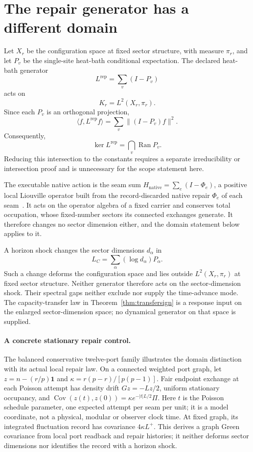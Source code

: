 \documentclass[11pt]{article}
\theoremstyle{remark}
\begin{document}
\section{The repair generator has a different domain}

Let \(X_r\) be the configuration space at fixed sector structure, with
measure \(\pi_r\), and let \(P_v\) be the single-site heat-bath conditional
expectation. The declared heat-bath generator
\[
L^{\mathrm{rep}}=\sum_v(I-P_v)
\]
acts on
\[
K_r=L^2(X_r,\pi_r).
\]
Since each \(P_v\) is an orthogonal projection,
\[
\langle f,L^{\mathrm{rep}}f\rangle
=\sum_v\|(I-P_v)f\|^2.
\]
Consequently,
\[
\ker L^{\mathrm{rep}}=\bigcap_v\operatorname{Ran}P_v.
\]
Reducing this intersection to the constants requires a separate
irreducibility or intersection proof and is unnecessary for the scope
statement here.

The executable native action is the seam sum
\(H_{\mathrm{native}}=\sum_e(I-\Phi_e)\), a positive local Liouville operator
built from the record-discarded native repair \(\Phi_e\) of each
seam~\cite{ophnativeaction}. It acts on the operator algebra of a fixed
carrier and conserves total occupation, whose fixed-number sectors its
connected exchanges generate. It therefore changes no sector dimension either,
and the domain statement below applies to it.

A horizon shock changes the sector dimensions \(d_\alpha\) in
\[
L_C=\sum_\alpha(\log d_\alpha)P_\alpha .
\]
Such a change deforms the configuration space and lies outside
\(L^2(X_r,\pi_r)\) at fixed sector structure. Neither generator
therefore acts on the sector-dimension shock. Their spectral gaps neither exclude
nor supply the time-advance mode. The capacity-transfer law in
Theorem~\ref{thm:transfersign} is a response input on the enlarged
sector-dimension space; no dynamical generator on that space is supplied.

\paragraph{A concrete stationary repair control.}
The balanced conservative twelve-port family illustrates the domain
distinction with its actual local repair law. On a connected weighted
port graph, let \(z=n-(r/p)\mathbf1\) and
\(\kappa=r(p-r)/[p(p-1)]\). Fair endpoint exchange at each Poisson
attempt has density drift \(Gz=-Lz/2\), uniform stationary occupancy,
and \(\operatorname{Cov}(z(t),z(0))=\kappa e^{-|t|L/2}\Pi\).
Here \(t\) is the Poisson schedule parameter, one expected attempt per seam
per unit; it is a model coordinate, not a physical, modular or observer clock
time. At fixed graph, its integrated fluctuation record has covariance
\(4\kappa L^+\). This derives a graph Green covariance from local port
readback and repair histories; it neither deforms sector dimensions nor
identifies the record with a horizon shock.
\end{document}
